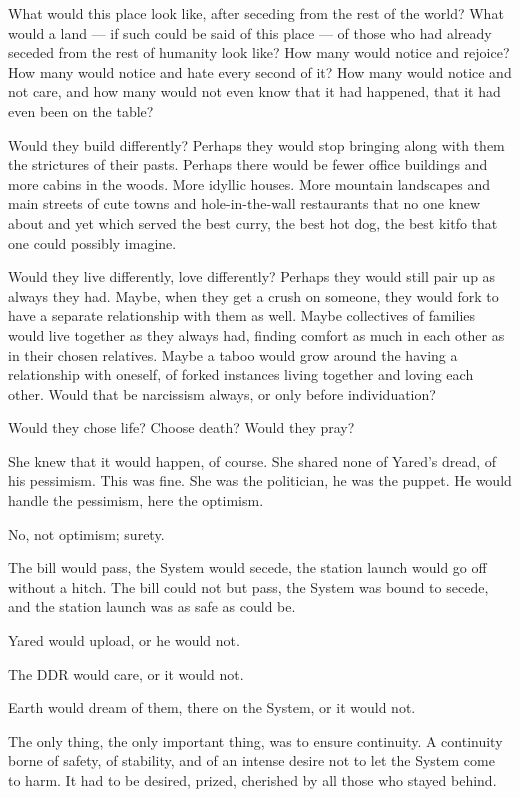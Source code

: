 What would this place look like, after seceding from the rest of the world? What would a land — if such could be said of this place — of those who had already seceded from the rest of humanity look like? How many would notice and rejoice? How many would notice and hate every second of it? How many would notice and not care, and how many would not even know that it had happened, that it had even been on the table?

Would they build differently? Perhaps they would stop bringing along with them the strictures of their pasts. Perhaps there would be fewer office buildings and more cabins in the woods. More idyllic houses. More mountain landscapes and main streets of cute towns and hole-in-the-wall restaurants that no one knew about and yet which served the best curry, the best hot dog, the best kitfo that one could possibly imagine.

Would they live differently, love differently? Perhaps they would still pair up as always they had. Maybe, when they get a crush on someone, they would fork to have a separate relationship with them as well. Maybe collectives of families would live together as they always had, finding comfort as much in each other as in their chosen relatives. Maybe a taboo would grow around the having a relationship with oneself, of forked instances living together and loving each other. Would that be narcissism always, or only before individuation?

Would they chose life? Choose death? Would they pray?

She knew that it would happen, of course. She shared none of Yared's dread, of his pessimism. This was fine. She was the politician, he was the puppet. He would handle the pessimism, here the optimism.

No, not optimism; surety.

The bill would pass, the System would secede, the station launch would go off without a hitch. The bill could not but pass, the System was bound to secede, and the station launch was as safe as could be.

Yared would upload, or he would not.

The DDR would care, or it would not.

Earth would dream of them, there on the System, or it would not.

The only thing, the only important thing, was to ensure continuity. A continuity borne of safety, of stability, and of an intense desire not to let the System come to harm. It had to be desired, prized, cherished by all those who stayed behind.

